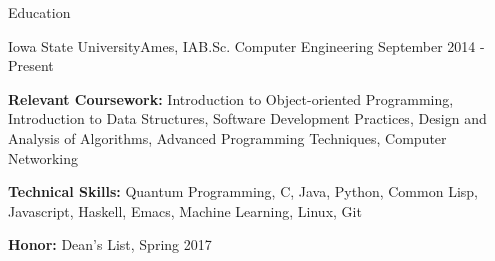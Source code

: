 \documentclass{resume} %
\begin{document}

\begin{rSection}{Education}

\begin{rSubsection}{Iowa State University}{Ames, IA}{B.Sc. Computer Engineering }{September 2014 - Present}


\item{\textbf{Relevant Coursework:} Introduction to Object-oriented Programming, Introduction to Data Structures, Software Development Practices, Design and Analysis of Algorithms, Advanced Programming Techniques, Computer Networking}
\item{\textbf{Technical Skills:} Quantum Programming, C, Java, Python, Common Lisp, Javascript, Haskell, Emacs, Machine Learning, Linux, Git}
\item{\textbf{Honor:} Dean's List, Spring 2017 }



\end{rSubsection}
\end{rSection}

\end{document}
